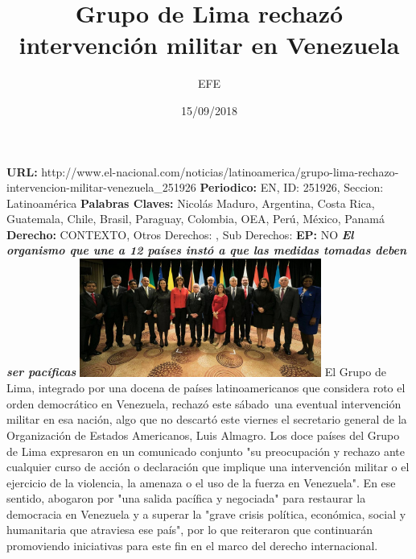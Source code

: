 \documentclass{article}%
\title{\textbf{Grupo de Lima rechazó intervención militar en Venezuela}}%
\author{EFE}%
\date{15/09/2018}%
\begin{document}
%
\normalsize%
\maketitle%
\textbf{URL: }%
http://www.el{-}nacional.com/noticias/latinoamerica/grupo{-}lima{-}rechazo{-}intervencion{-}militar{-}venezuela\_251926\newline%
%
\textbf{Periodico: }%
EN, %
ID: %
251926, %
Seccion: %
Latinoamérica\newline%
%
\textbf{Palabras Claves: }%
Nicolás Maduro, Argentina, Costa Rica, Guatemala, Chile, Brasil, Paraguay, Colombia, OEA, Perú, México, Panamá\newline%
%
\textbf{Derecho: }%
CONTEXTO, %
Otros Derechos: %
, %
Sub Derechos: %
\newline%
%
\textbf{EP: }%
NO\newline%
\newline%
%
\textbf{\textit{El organismo que une a 12 países instó a que las medidas tomadas deben ser pacíficas}}%
\newline%
\newline%
%
\includegraphics[width=300px]{11.jpg}%
\newline%
%
El Grupo de Lima, integrado por una docena de países latinoamericanos que considera roto el orden democrático en Venezuela, rechazó este sábado~una eventual intervención militar en esa nación, algo que no descartó este viernes el secretario general de la Organización de Estados Americanos, Luis Almagro.%
\newline%
%
Los doce países del Grupo de Lima expresaron en un comunicado conjunto "su preocupación y rechazo ante cualquier curso de acción o declaración que implique una intervención militar o el ejercicio de la violencia, la amenaza o el uso de la fuerza en Venezuela".%
\newline%
%
En ese sentido, abogaron por "una salida pacífica y negociada" para restaurar la democracia en Venezuela y a superar la "grave crisis política, económica, social y humanitaria que atraviesa ese país", por lo que reiteraron que continuarán promoviendo iniciativas para este fin en el marco del derecho internacional.%
\end{document}
